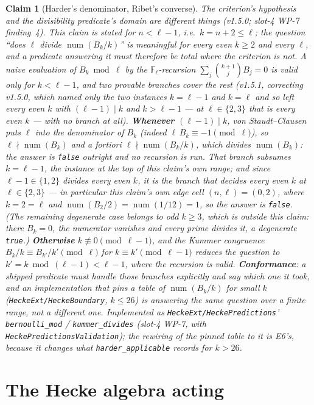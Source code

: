 \documentclass[11pt]{article}
\newtheorem{claim}[theorem]{Claim}
\theoremstyle{remark}
\newcommand{\F}{\mathbb{F}}
\newcommand{\Fl}{\F_\ell}
\DeclareMathOperator{\num}{num}
\begin{document}
\begin{claim}[Harder's denominator, Ribet's converse]
\emph{The criterion's hypothesis and the divisibility predicate's domain are different
things} (v1.5.0; slot-4 WP-7 finding~4). This claim is stated for $n<\ell-1$, i.e.\
$k=n+2\le\ell$; the \emph{question} ``does $\ell$ divide $\num(B_k/k)$'' is meaningful for
every even $k\ge2$ and every $\ell$, and a predicate answering it must therefore be total
where the criterion is not. A naive evaluation of $B_k\bmod\ell$ by the $\Fl$-recursion
$\sum_{j}\binom{k+1}{j}B_j=0$ is valid only for $k<\ell-1$, and two provable branches
cover the rest (v1.5.1, correcting v1.5.0, which named only the two instances $k=\ell-1$
and $k=\ell$ and so left every even $k$ with $(\ell-1)\mid k$ and $k>\ell-1$ --- at
$\ell\in\{2,3\}$ that is \emph{every} even $k$ --- with no branch at all).
\textbf{Whenever $(\ell-1)\mid k$}, von Staudt--Clausen puts $\ell$ into the
\emph{denominator} of $B_k$ (indeed $\ell\,B_{k}\equiv-1\pmod\ell$), so $\ell\nmid\num(B_k)$
and a fortiori $\ell\nmid\num(B_k/k)$, which divides $\num(B_k)$: the answer is
\texttt{false} outright and no recursion is run. That branch subsumes $k=\ell-1$, the
instance at the top of this claim's own range; and since $\ell-1\in\{1,2\}$ divides every
even $k$, it is the branch that decides \emph{every} even $k$ at $\ell\in\{2,3\}$ --- in
particular this claim's own edge cell $(n,\ell)=(0,2)$, where $k=2=\ell$ and
$\num(B_2/2)=\num(1/12)=1$, so the answer is \texttt{false}. (The remaining degenerate case
belongs to \emph{odd} $k\ge3$, which is outside this claim: there $B_k=0$, the numerator
vanishes and every prime divides it, a degenerate \texttt{true}.) \textbf{Otherwise}
$k\not\equiv0\pmod{\ell-1}$, and the Kummer congruence $B_{k}/k\equiv
B_{k'}/k'\pmod\ell$ for $k\equiv k'\pmod{\ell-1}$ reduces
the question to $k'=k\bmod(\ell-1)<\ell-1$, where the recursion is valid. \textbf{Conformance}: a shipped predicate must handle those branches explicitly
and say which one it took, and an implementation that pins a table of $\num(B_k/k)$ for
small $k$ (\texttt{HeckeExt/HeckeBoundary}, $k\le26$) is answering the same question over a
finite range, not a different one. Implemented as
\texttt{HeckeExt/HeckePredictions}' \texttt{bernoulli\_mod} / \texttt{kummer\_divides}
(slot-4 WP-7, with \texttt{HeckePredictionsValidation}); the rewiring of the pinned table to
it is E6's, because it changes what \texttt{harder\_applicable} records for $k>26$.
\end{claim}

\section{The Hecke algebra acting}\label{sec:hecke}
\end{document}
